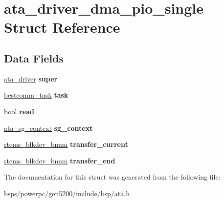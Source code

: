 \hypertarget{structata__driver__dma__pio__single}{}\section{ata\+\_\+driver\+\_\+dma\+\_\+pio\+\_\+single Struct Reference}
\label{structata__driver__dma__pio__single}
\subsection*{Data Fields}
\begin{DoxyCompactItemize}
\item 
\mbox{\label{structata__driver__dma__pio__single_acf4094ce8c3f2f10a18aaf4e692d9402}} 
\mbox{\hyperlink{structata__driver}{ata\+\_\+driver}} {\bfseries super}
\item 
\mbox{\label{structata__driver__dma__pio__single_a208131c2c80eaf3f3910f9f1444cb8f0}} 
\mbox{\hyperlink{structbestcomm__task}{bestcomm\+\_\+task}} {\bfseries task}
\item 
\mbox{\label{structata__driver__dma__pio__single_aa70e346030f6794745aa273c9a190ba6}} 
bool {\bfseries read}
\item 
\mbox{\label{structata__driver__dma__pio__single_a08436cf04ed407290f7173ee7b70e123}} 
\mbox{\hyperlink{structata__sg__context}{ata\+\_\+sg\+\_\+context}} {\bfseries sg\+\_\+context}
\item 
\mbox{\label{structata__driver__dma__pio__single_a91f72a8c3059b3933c35ab7182ce0f56}} 
\mbox{\hyperlink{group__rtems__disk_ga5fbcfd40b657bff6c54d9e393fab3274}{rtems\+\_\+blkdev\+\_\+bnum}} {\bfseries transfer\+\_\+current}
\item 
\mbox{\label{structata__driver__dma__pio__single_aa707cdb2bf46e468ca34941f2faba230}} 
\mbox{\hyperlink{group__rtems__disk_ga5fbcfd40b657bff6c54d9e393fab3274}{rtems\+\_\+blkdev\+\_\+bnum}} {\bfseries transfer\+\_\+end}
\end{DoxyCompactItemize}


The documentation for this struct was generated from the following file\+:\begin{DoxyCompactItemize}
\item 
bsps/powerpc/gen5200/include/bsp/ata.\+h\end{DoxyCompactItemize}
